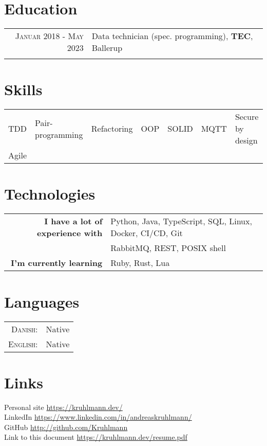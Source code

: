 \documentclass[a4paper,10pt]{article}
\begin{document}
\section{Education}
\begin{tabular}{rl}	
    \textsc{Januar 2018 - May 2023} & Data technician (spec. programming), \textbf{TEC}, Ballerup\\ & \\
\end{tabular}

\section{Skills}
\begin{tabular}{lllllll}
    TDD & Pair-programming & Refactoring & OOP & SOLID & MQTT & Secure by design\\
    Agile \\
\end{tabular}

\section{Technologies}
\begin{tabular}{rl}
    \textbf{I have a lot of experience with} & Python, Java, TypeScript, SQL, Linux, Docker, CI/CD, Git\\
    & RabbitMQ, REST, POSIX shell \\
    \textbf{I'm currently learning} & Ruby, Rust, Lua
\end{tabular}

\section{Languages}
\begin{tabular}{rl}
 \textsc{Danish:}&Native\\
\textsc{English:}&Native\\
\end{tabular}

\section{Links}
Personal site \href{https://kruhlmann.dev/}{https://kruhlmann.dev/}\\
LinkedIn \href{https://www.linkedin.com/in/andreaskruhlmann/}{https://www.linkedin.com/in/andreaskruhlmann/}\\
GitHub  \href{https://github.com/Kruhlmann}{http://github.com/Kruhlmann} \\
Link to this document \href{https://kruhlmann.dev/resume.pdf}{https://kruhlmann.dev/resume.pdf}\\
\end{document}
